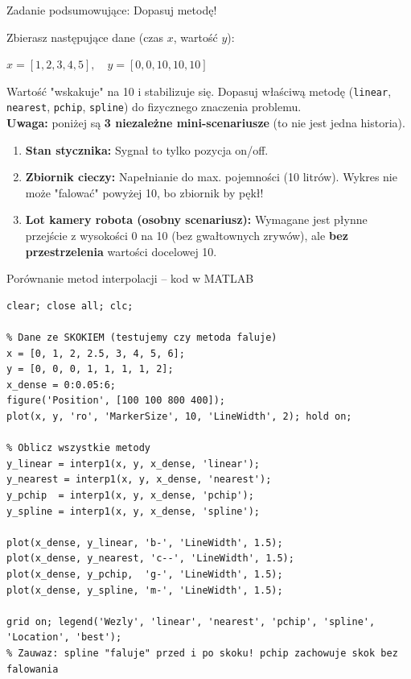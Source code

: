 \documentclass[11pt,aspectratio=169,table]{beamer}
\begin{document}
\begin{frame}{Zadanie podsumowujące: Dopasuj metodę!}
	\begin{tcolorbox}[colback=purple!5!white,colframe=purple!75!black,title=Analiza zachowania dla punktów węzłowych]
		Zbierasz następujące dane (czas $x$, wartość $y$):\\
		\centerline{$x = [1, 2, 3, 4, 5], \quad y = [0, 0, 10, 10, 10]$}
		
		\vspace{0.2cm}
		Wartość "wskakuje" na 10 i stabilizuje się. Dopasuj właściwą metodę (\texttt{linear}, \texttt{nearest}, \texttt{pchip}, \texttt{spline}) do fizycznego znaczenia problemu.\\
		\textbf{Uwaga:} poniżej są \textbf{3 niezależne mini-scenariusze} (to nie jest jedna historia).
		
		\begin{enumerate}
			\item \textbf{Stan stycznika:} Sygnał to tylko pozycja on/off.
			\item \textbf{Zbiornik cieczy:} Napełnianie do max. pojemności (10 litrów). Wykres nie może "falować" powyżej 10, bo zbiornik by pękł!
			\item \textbf{Lot kamery robota (osobny scenariusz):} Wymagane jest płynne przejście z wysokości 0 na 10 (bez gwałtownych zrywów), ale \textbf{bez przestrzelenia} wartości docelowej 10.
		\end{enumerate}
	\end{tcolorbox}
\end{frame}

\begin{frame}[fragile]{Porównanie metod interpolacji – kod w MATLAB}
\begin{lstlisting}[caption={Porownanie wszystkich 4 metod interpolacji}]
clear; close all; clc;

% Dane ze SKOKIEM (testujemy czy metoda faluje)
x = [0, 1, 2, 2.5, 3, 4, 5, 6];
y = [0, 0, 0, 1, 1, 1, 1, 2];
x_dense = 0:0.05:6;
figure('Position', [100 100 800 400]);
plot(x, y, 'ro', 'MarkerSize', 10, 'LineWidth', 2); hold on;

% Oblicz wszystkie metody
y_linear = interp1(x, y, x_dense, 'linear');
y_nearest = interp1(x, y, x_dense, 'nearest');
y_pchip  = interp1(x, y, x_dense, 'pchip');
y_spline = interp1(x, y, x_dense, 'spline');

plot(x_dense, y_linear, 'b-', 'LineWidth', 1.5);
plot(x_dense, y_nearest, 'c--', 'LineWidth', 1.5);
plot(x_dense, y_pchip,  'g-', 'LineWidth', 1.5);
plot(x_dense, y_spline, 'm-', 'LineWidth', 1.5);

grid on; legend('Wezly', 'linear', 'nearest', 'pchip', 'spline', 'Location', 'best');
% Zauwaz: spline "faluje" przed i po skoku! pchip zachowuje skok bez falowania
\end{lstlisting}
\end{frame}
\end{document}
